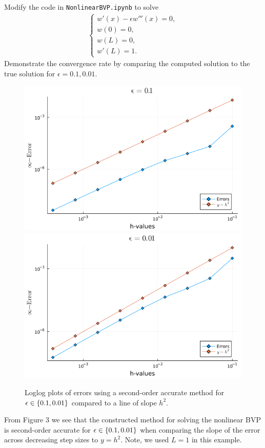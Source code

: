 \documentclass[12pt]{report}
\begin{document}
\newpage


\begin{problem}
    Modify the code in {\tt NonlinearBVP.ipynb} to solve
    \begin{align*}
   \begin{cases}
   w'(x) - \epsilon w'''(x) = 0,\\
   w(0) = 0,\\
   w(L) = 0,\\
   w'(L) = 1.
   \end{cases}
    \end{align*}
   Demonstrate the convergence rate by comparing the computed solution
   to the true solution for $\epsilon = 0.1, 0.01$.
\end{problem}

\begin{solution}
  \begin{figure}[h!]
    \centering
    \includegraphics[width=0.48\linewidth]{images/1a2.png}
    \includegraphics[width=0.48\linewidth]{images/2a2.png}
    \caption{Loglog plots of errors using a second-order accurate method for ${\epsilon} \in \{0.1,0.01\}$ compared to a line of slope $h^2$.}
  \end{figure}
  
  From Figure 3 we see that the constructed method for solving the nonlinear BVP is second-order accurate for ${\epsilon} \in \{0.1,0.01\}$ when comparing the slope of the error across decreasing step sizes to $y = h^2$. Note, we used $L=1$ in this example.

\end{solution}
\end{document}
